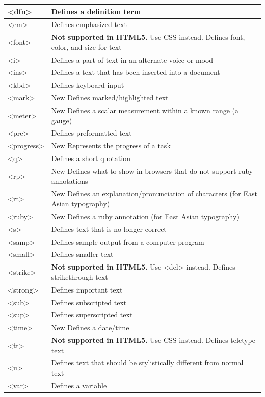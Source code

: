 \documentclass[a4paper,oneside]{book}
\begin{document}
\begin{longtable}[H]{| p{5cm} | p{10cm} |}
<dfn>		& Defines a definition term \\ \hline 
<em>		& Defines emphasized text  \\ \hline 
<font>		& \textbf{Not supported in HTML5.} Use CSS instead.
Defines font, color, and size for text \\ \hline 
<i>		& Defines a part of text in an alternate voice or mood \\ \hline 
<ins>		& Defines a text that has been inserted into a document \\ \hline 
<kbd>		& Defines keyboard input \\ \hline 
<mark>	& New	Defines marked/highlighted text \\ \hline 
<meter>	& New	Defines a scalar measurement within a known range (a gauge) \\ \hline 
<pre>		& Defines preformatted text \\ \hline 
<progress>	& New	Represents the progress of a task \\ \hline 
<q>		& Defines a short quotation \\ \hline 
<rp>	& New	Defines what to show in browsers that do not support ruby annotations \\ \hline 
<rt>	& New	Defines an explanation/pronunciation of characters (for East Asian typography) \\ \hline 
<ruby>	& New	Defines a ruby annotation (for East Asian typography) \\ \hline 
<s>		& Defines text that is no longer correct \\ \hline 
<samp>		& Defines sample output from a computer program \\ \hline 
<small>		& Defines smaller text \\ \hline 
<strike>		& \textbf{Not supported in HTML5.} Use <del> instead.
Defines strikethrough text \\ \hline 
<strong>		& Defines important text \\ \hline 
<sub>	& 	Defines subscripted text \\ \hline 
<sup>		& Defines superscripted text \\ \hline 
<time> & New	Defines a date/time \\ \hline 
<tt>		& \textbf{Not supported in HTML5.} Use CSS instead.
Defines teletype text \\ \hline 
<u>		& Defines text that should be stylistically different from normal text \\ \hline 
<var>		& Defines a variable \\ \hline 

\end{longtable}
\end{document}
